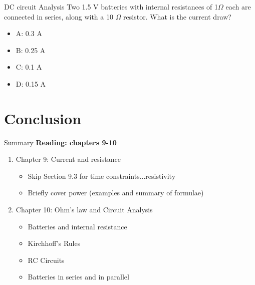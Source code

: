 \documentclass{beamer}
\begin{document}
\begin{frame}{DC circuit Analysis}
Two 1.5 V batteries with internal resistances of 1$\Omega$ each are connected in series, along with a 10 $\Omega$ resistor.  What is the current draw?
\begin{itemize}
\item A: 0.3 A
\item B: 0.25 A
\item C: 0.1 A
\item D: 0.15 A
\end{itemize}
\end{frame}

\section{Conclusion}

\begin{frame}{Summary}
\textbf{Reading: chapters 9-10}
\begin{enumerate}
\item Chapter 9: Current and resistance
\begin{itemize}
\item Skip Section 9.3 for time constraints...resistivity
\item Briefly cover power (examples and summary of formulae)
\end{itemize}
\item Chapter 10: Ohm's law and Circuit Analysis
\begin{itemize}
\item Batteries and internal resistance
\item Kirchhoff's Rules
\item RC Circuits
\item Batteries in series and in parallel
\end{itemize}
\end{enumerate}
\end{frame}
\end{document}
